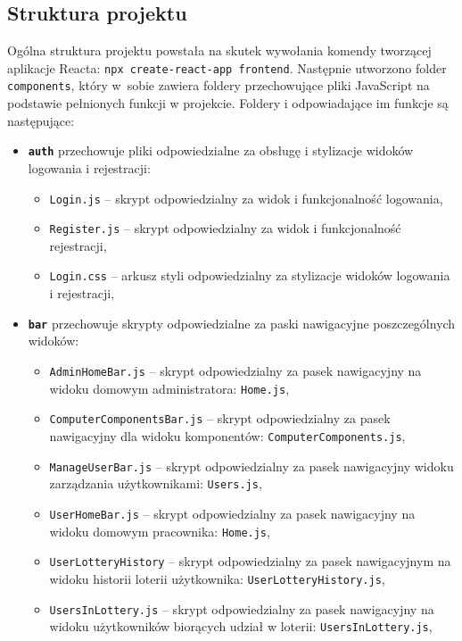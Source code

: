 \subsection{Struktura projektu}
Ogólna struktura projektu powstała na skutek wywołania komendy tworzącej aplikacje Reacta: \texttt{npx create-react-app frontend}. Następnie utworzono folder \texttt{components}, który w~sobie zawiera foldery przechowujące pliki JavaScript na podstawie pełnionych funkcji w projekcie. Foldery i odpowiadające im funkcje są następujące: 
\begin {itemize}
\item \texttt{\textbf{auth}} przechowuje pliki odpowiedzialne za obsługę i stylizacje widoków logowania i rejestracji:
	\begin{itemize}
	\item \texttt{Login.js} -- skrypt odpowiedzialny za widok i funkcjonalność logowania,
	\item \texttt{Register.js} -- skrypt odpowiedzialny za widok i funkcjonalność rejestracji,
	\item \texttt{Login.css} -- arkusz styli odpowiedzialny za stylizacje widoków logowania i rejestracji,
	\end{itemize}
\item \texttt{\textbf{bar}} przechowuje skrypty odpowiedzialne za paski nawigacyjne poszczególnych widoków:
	\begin{itemize}
	\item \texttt{AdminHomeBar.js} -- skrypt odpowiedzialny za pasek nawigacyjny na widoku domowym administratora: \texttt{Home.js},
	\item \texttt{ComputerComponentsBar.js} -- skrypt odpowiedzialny za pasek nawigacyjny dla widoku komponentów: \texttt{ComputerComponents.js},
	\item \texttt{ManageUserBar.js} -- skrypt odpowiedzialny za pasek nawigacyjny widoku zarządzania użytkownikami: \texttt{Users.js},
	\item \texttt{UserHomeBar.js} -- skrypt odpowiedzialny za pasek nawigacyjny na widoku domowym pracownika: \texttt{Home.js},
	\item \texttt{UserLotteryHistory} -- skrypt odpowiedzialny za pasek nawigacyjnym na widoku historii loterii użytkownika: \texttt{UserLotteryHistory.js},
	\item \texttt{UsersInLottery.js} -- skrypt odpowiedzialny za pasek nawigacyjny na widoku użytkowników biorących udział w loterii: \texttt{UsersInLottery.js},
	\end{itemize}

\end{itemize}
